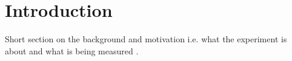 \section{Introduction}\label{sec:intro}
Short section on the background and motivation i.e. what the experiment is about and what is being measured \cite{lab-manual}.
